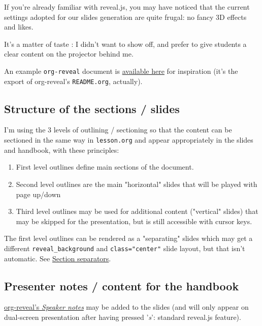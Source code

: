 \documentclass[a4paper]{article}
\begin{document}
If you're already familiar with reveal.js, you may have noticed that
the current settings adopted for our slides generation are quite
frugal: no fancy 3D effects and likes.


\begin{NOTES}
It's a matter of taste : I didn't want to show off, and prefer to give
students a clear content on the projector behind me.

An example \texttt{org-reveal} document is \href{elisp/org-reveal/Readme.html}{available here} for inspiration (it's the export of org-reveal's \texttt{README.org}, actually).
\end{NOTES}

\subsection{Structure of the sections / slides}
\label{sec:org5934465}

I'm using the 3 levels of outlining / sectioning so that the content can be sectioned in the same way in \texttt{lesson.org} and appear appropriately in the slides and handbook, with these principles:

\begin{enumerate}
\item First level outlines define main sections of the document.
\item Second level outlines are the main "horizontal" slides that will be played with page up/down
\item Third level outlines may be used for additional content ("vertical" slides) that may be skipped for the presentation, but is still accessible with cursor keys.
\end{enumerate}

\begin{NOTES}
The first level outlines can be rendered as a "separating" slides which may get a different \texttt{reveal\_background} and \texttt{class="center"} slide layout, but that isn't automatic. See \hyperref[sec:org5a0d7a1]{Section separators}.
\end{NOTES}

\subsection{Presenter notes / content for the handbook}
\label{sec:orgbd6ec2b}

\href{https://github.com/yjwen/org-reveal/\#speaker-notes}{org-reveal's \emph{Speaker notes}} may be added to the slides (and will only appear on
dual-screen presentation after having pressed '\emph{s}': standard reveal.js
feature).
\end{document}
